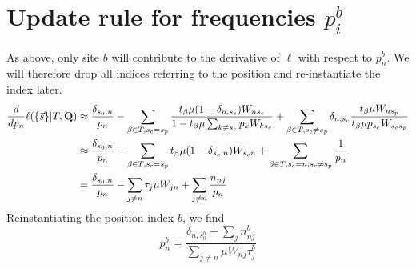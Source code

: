 \documentclass[aps,rmp,onecolumn]{revtex4}
\newcommand{\mat}[1]{{\bf #1}}
\newcommand{\eqp}{p}
\newcommand{\lh}{\ell}
\begin{document}
\section*{Update rule for frequencies $\eqp_i^b$}
As above, only site $b$ will contribute to the derivative of $\lh$ with respect to $\eqp^b_n$.
We will therefore drop all indices referring to the position and re-instantiate the index later.
\begin{equation}
\begin{split}
	\frac{d}{d \eqp_n} \lh (\{\vec{s}\} |T, \mat{Q}) & \approx \frac{\delta_{s_0,n}}{\eqp_n}
	-\sum_{\beta\in T,s_c=s_p} \frac{t_\beta\mu (1-\delta_{n,s_c})W_{n s_c}}{1 - t_\beta\mu \sum_{k\neq s_c} \eqp_k W_{ks_c}}
	 + \sum_{\beta\in T,s_c\neq s_p} \delta_{n,s_c}\frac{t_\beta\mu W_{ns_p}}{t_\beta \mu \eqp_{s_c} W_{s_c s_p}}\\
	 & \approx 	\frac{\delta_{s_0,n}}{\eqp_n}-\sum_{\beta\in T,s_c=s_p} t_\beta\mu (1-\delta_{s_c, n})W_{s_c n}
	 + \sum_{\beta\in T,s_c=n, s_c\neq s_p} \frac{1}{\eqp_{n}}\\
	 & = 	\frac{\delta_{s_0,n}}{\eqp_n}-\sum_{j\neq n} \tau_j \mu W_{j n}
	 + \sum_{j\neq n}\frac{n_{nj}}{\eqp_{n}}
\end{split}
\end{equation}
Reinstantiating the position index $b$, we find
\begin{equation}
	\eqp^b_n = \frac{\delta_{n,s^b_0}+\sum_j n^b_{nj}}{\sum_{j\neq n} \mu W_{nj}\tau^b_j}
\end{equation}
\end{document}
